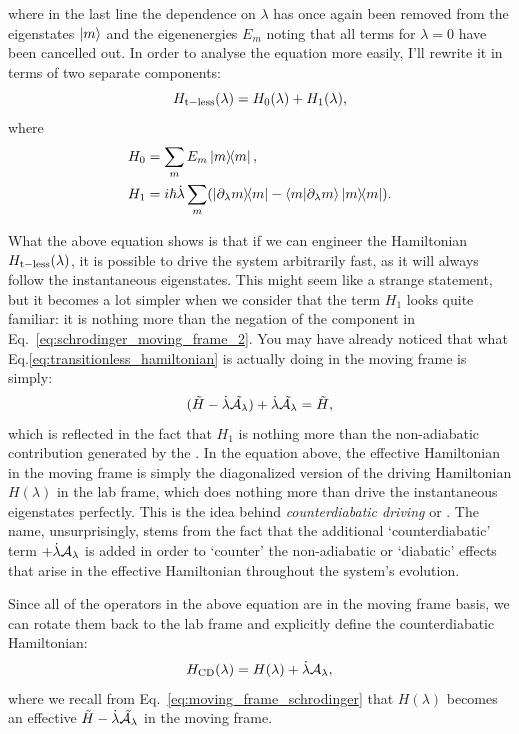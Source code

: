     where in the last line the dependence on $\lambda$ has once again been removed from the eigenstates $\ket{m}$ and the eigenenergies $E_m$ noting that all terms for $\lambda = 0$ have been cancelled out. In order to analyse the equation more easily, I'll rewrite it in terms of two separate components:
    \begin{equation}\label{eq:transitionless_h0_h1}
        H_{\rm t-less}(\lambda) = H_0(\lambda) + H_1(\lambda),
    \end{equation}
    where 
    \begin{equation}
        \begin{aligned}
            H_0 &= \sum_m E_m \dyad{m}, \\
            H_1 &= i\hbar \dotlambda \sum_m (\dyad{\dlambda m}{m} - \braket{m}{\dlambda m} \dyad{m}).
        \end{aligned}
    \end{equation}

    What the above equation shows is that if we can engineer the Hamiltonian $H_{\rm t-less} (\lambda)$, it is possible to drive the system arbitrarily fast, as it will always follow the instantaneous eigenstates. This might seem like a strange statement, but it becomes a lot simpler when we consider that the term $H_1$ looks quite familiar: it is nothing more than the negation of the  component in Eq.~\eqref{eq:schrodinger_moving_frame_2}. You may have already noticed that what Eq.\eqref{eq:transitionless_hamiltonian} is actually doing in the moving frame is simply:
    \begin{equation}\label{eq:AGP_cancelling_out}
    	(\Tilde{H} - \dot{\lambda} \Tilde{\mathcal{A}_{\lambda}}) + \dot{\lambda} \Tilde{\mathcal{A}_{\lambda}} = \Tilde{H},
    \end{equation}
    which is reflected in the fact that $H_1$ is nothing more than the non-adiabatic contribution generated by the . In the equation above, the effective Hamiltonian in the moving frame is simply the diagonalized version of the driving Hamiltonian $H(\lambda)$ in the lab frame, which does nothing more than drive the instantaneous eigenstates perfectly. This is the idea behind \emph{counterdiabatic driving} or . The name, unsurprisingly, stems from the fact that the additional `counterdiabatic' term $+ \dot{\lambda}\mathcal{A}_{\lambda}$ is added in order to `counter' the non-adiabatic or `diabatic' effects that arise in the effective Hamiltonian throughout the system's evolution.
    
    Since all of the operators in the above equation are in the moving frame basis, we can rotate them back to the lab frame and explicitly define the counterdiabatic Hamiltonian:
    \begin{equation}\label{eq:CD_Hamiltonian}
    H_{\rm CD}(\lambda) = H(\lambda) + \dot{\lambda} \mathcal{A}_\lambda,
    \end{equation}
    where we recall from Eq.~\eqref{eq:moving_frame_schrodinger} that $H(\lambda)$ becomes an effective $\Tilde{H} - \dot{\lambda} \Tilde{\mathcal{A}_{\lambda}}$ in the moving frame.


